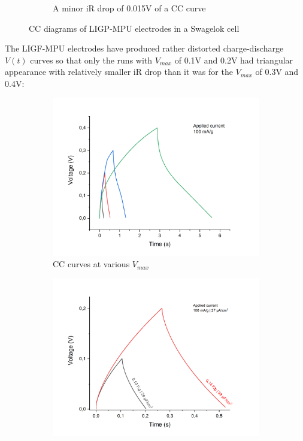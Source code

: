 \begin{figure}[H]
\begin{subfigure}{0.49\textwidth}
\captionsetup{width=0.9\linewidth}
\caption{A minor iR drop of 0.015\:V of a CC curve}
\label{fig:LIGP-MPU-cell1-iR}
\end{subfigure}
\medskip
\caption{CC diagrams of LIGP-MPU electrodes in a Swagelok cell}
\label{fig:LIGP-MPU-CC}
\end{figure}

The LIGF-MPU electrodes have produced rather distorted charge-discharge $V(t)$ curves so that only the runs with $V_{max}$ of 0.1\:V and 0.2\:V had triangular appearance with relatively smaller iR drop than it was for the $V_{max}$ of 0.3\:V and 0.4\:V:

\begin{figure}[H]
\begin{subfigure}{0.49\textwidth}
\includegraphics[width=1\textwidth]{Figures/Results/Electrochemistry/LIGF-MPU-NaNO3-Swagelok/Cell1/GCPL-all-voltages.jpg} 
\captionsetup{width=0.9\linewidth}
\caption{CC curves at various $V_{max}$}
\label{fig:LIGF-MPU-cell1-CC}
\end{subfigure}
\begin{subfigure}{0.49\textwidth}
\includegraphics[width=1\textwidth]{Figures/Results/Electrochemistry/LIGF-MPU-NaNO3-Swagelok/Cell1/GCPL-low-voltages.jpg}

\end{subfigure}
\end{figure}

